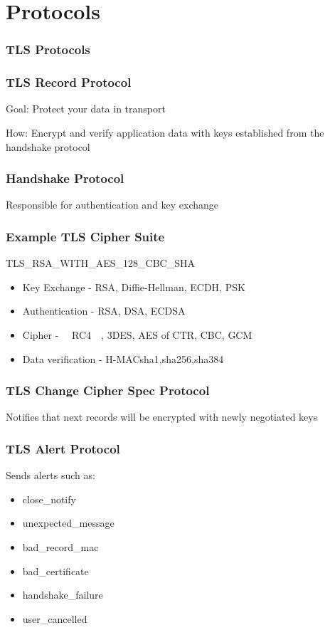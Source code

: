 \documentclass{beamer}
\begin{document}
\section{Protocols}

\begin{frame}
\frametitle{TLS Protocols}
\end{frame}

\begin{frame}
\frametitle{TLS Record Protocol}
Goal: Protect your data in transport

How: Encrypt and verify application data with keys established from the handshake protocol

\end{frame}

\begin{frame}
\frametitle{Handshake Protocol}
Responsible for authentication and key exchange
\end{frame}

\begin{frame}
\frametitle{Example TLS Cipher Suite}
 TLS\_RSA\_WITH\_AES\_128\_CBC\_SHA
  \begin {itemize}
    \item Key Exchange - RSA, Diffie-Hellman, ECDH, PSK
    \item Authentication - RSA, DSA, ECDSA
    \item Cipher - ~~RC4~~, 3DES, AES of CTR, CBC, GCM
    \item Data verification - H-MAC{sha1,sha256,sha384}
  \end {itemize}
\end{frame}


\begin{frame}
\frametitle{TLS Change Cipher Spec Protocol}
Notifies that next records will be encrypted with newly negotiated keys
\end{frame}

\begin{frame}
\frametitle{TLS Alert Protocol}
Sends alerts such as:
  \begin {itemize}
  \item close\_notify
  \item unexpected\_message
  \item bad\_record\_mac
  \item bad\_certificate
  \item handshake\_failure
  \item user\_cancelled
  \end {itemize}
\end{frame}
\end{document}
